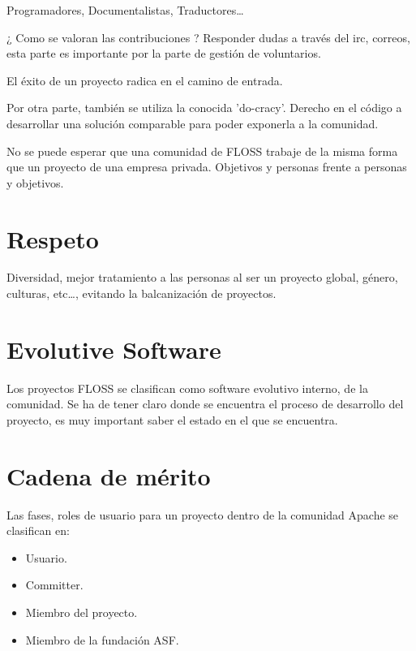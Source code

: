 \documentclass[11pt]{scrartcl}
\begin{document}
\par Programadores, Documentalistas, Traductores\ldots

\par ¿ Como se valoran las contribuciones ? Responder dudas a través del irc, correos, esta parte es importante por la parte de gestión de voluntarios.

\par El éxito de un proyecto radica en el camino de entrada.

\par Por otra parte, también se utiliza la conocida 'do-cracy'. Derecho en el código a desarrollar una solución comparable para poder exponerla a la comunidad.

\par No se puede esperar que una comunidad de FLOSS trabaje de la misma forma que un proyecto de una empresa privada. Objetivos y personas frente a personas y objetivos.


\section{Respeto}
\label{sec:respeto}

Diversidad, mejor tratamiento a las personas al ser un proyecto global, género, culturas, etc\ldots, evitando la balcanización de proyectos.


\section{Evolutive Software}
\label{sec:evo-software}

\par Los proyectos FLOSS se clasifican como software evolutivo interno, de la comunidad. Se ha de tener claro donde se encuentra el proceso de desarrollo del proyecto, es muy important saber el estado en el que se encuentra.


\section{Cadena de mérito}
\label{sec:merit-chain}

\par Las fases, roles de usuario para un proyecto dentro de la comunidad Apache se clasifican en:
\begin{itemize}
	\item Usuario.
	\item Committer.
	\item Miembro del proyecto.
	\item Miembro de la fundación ASF.
\end{itemize}
\end{document}
